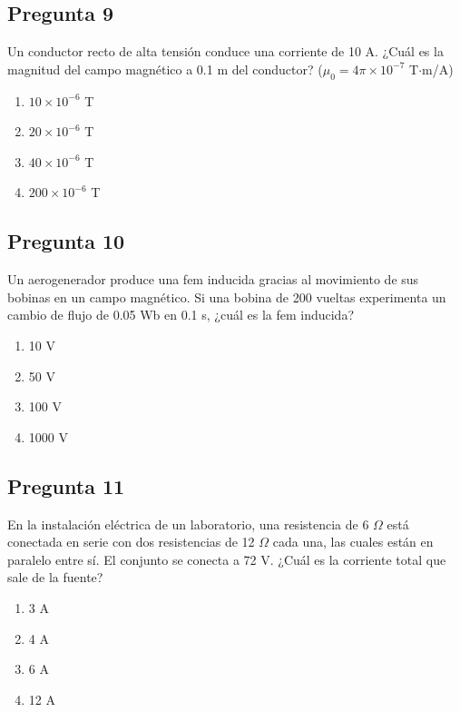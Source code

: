 \begin{preguntabox}
\subsection{Pregunta 9}
Un conductor recto de alta tensión conduce una corriente de 10 A. ¿Cuál es la magnitud del campo magnético a 0.1 m del conductor? ($\mu_0 = 4\pi \times 10^{-7}$ T$\cdot$m/A)

\begin{enumerate}
    \item[A)] $10 \times 10^{-6}$ T
    \item[B)] $20 \times 10^{-6}$ T
    \item[C)] $40 \times 10^{-6}$ T
    \item[D)] $200 \times 10^{-6}$ T
\end{enumerate}
\end{preguntabox}

\begin{preguntabox}
\subsection{Pregunta 10}
Un aerogenerador produce una fem inducida gracias al movimiento de sus bobinas en un campo magnético. Si una bobina de 200 vueltas experimenta un cambio de flujo de 0.05 Wb en 0.1 s, ¿cuál es la fem inducida?

\begin{enumerate}
    \item[A)] 10 V
    \item[B)] 50 V
    \item[C)] 100 V
    \item[D)] 1000 V
\end{enumerate}
\end{preguntabox}


\begin{preguntabox}
\subsection{Pregunta 11}
En la instalación eléctrica de un laboratorio, una resistencia de 6 $\Omega$ está conectada en serie con dos resistencias de 12 $\Omega$ cada una, las cuales están en paralelo entre sí. El conjunto se conecta a 72 V. ¿Cuál es la corriente total que sale de la fuente?

\begin{enumerate}
    \item[A)] 3 A
    \item[B)] 4 A
    \item[C)] 6 A
    \item[D)] 12 A
\end{enumerate}
\end{preguntabox}

